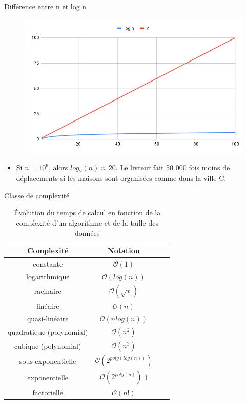 \documentclass[10pt,xcolor=dvipsnames]{beamer}
\begin{document}
\begin{frame}{Différence entre n et log n}
    \begin{figure}
        \centering
        \includegraphics[scale=0.4]{figures/CM0/comp_n_log_n.png}
    \end{figure}
    \begin{itemize}
        \item Si $n = 10^6$, alors $log_2(n) \approx 20 $. Le livreur fait 50 000 fois moins de déplacements si les maisons sont organisées comme dans la ville C.
        
    \end{itemize}
\end{frame}

\begin{frame}{Classe de complexité}
\begin{table}[]
\centering
\begin{tabular}{|c|c|c|c|}
\hline
\textbf{Complexité} & \textbf{Notation}\\
\hline
constante & $\mathcal{O}(1)$ \\
logarithmique &   $\mathcal{O}(log(n))$\\
racinaire &   $\mathcal{O}(\sqrt{x})$ \\
linéaire &    $\mathcal{O}(n)$ \\
quasi-linéaire & $\mathcal{O}(nlog(n))$ \\
quadratique (polynomial) &     $\mathcal{O}(n^2)$ \\
cubique (polynomial) &   $\mathcal{O}(n^3)$ \\
sous-exponentielle &   $\mathcal{O}(2^{poly(log(n))})$ \\
exponentielle &    $\mathcal{O}(2^{poly(n)})$ )\\
factorielle &  $\mathcal{O}(n!)$\\
\hline
\end{tabular}
\captionsetup{justification=centering}
\caption{Évolution du temps de calcul en fonction de la complexité d'un algorithme et de la taille des données}
\label{table:Complexity}
\end{table}

\end{frame}
\end{document}
